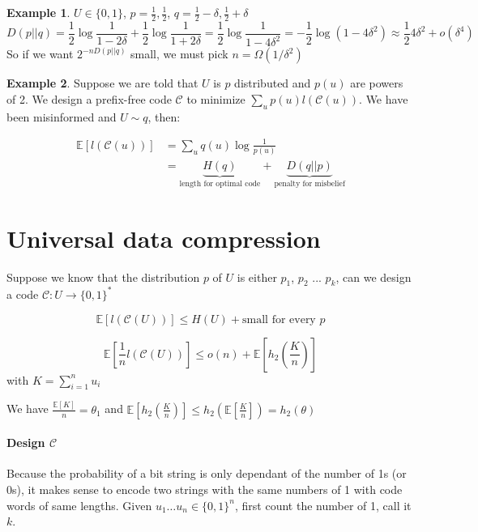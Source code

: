 \documentclass[twoside]{article}
\theoremstyle{definition} %
\newtheorem{example}{Example}
\newcommand{\Ex}[1]{\mathbb{E}\left[#1\right]}
\newcommand{\pfrac}[2]{\left( \frac{#1}{#2} \right)}
\def\C{\mathcal{C}}
\begin{document}
\begin{example}
  $U \in \{0,1\}$, $p=\frac 1 2, \frac 1 2$, $q=\frac 1 2 - \delta, \frac 1 2 + \delta$
  \[
    D(p||q) = \frac 1 2 \log \frac 1 {1-2\delta} + \frac 1 2 \log \frac 1 {1+2\delta} = \frac 1 2 \log \frac 1 {1-4\delta^2} = - \frac 1 2 \log (1-4\delta^2) \approx \frac 1 2 4\delta^2 + o(\delta^4)
  \]
  So if we want $2^{-n D(p||q)}$ small, we must pick $n=\Omega(1/\delta^2)$
\end{example}

\begin{example}
  Suppose we are told that $U$ is $p$ distributed and $p(u)$ are powers of 2. We design a prefix-free code $\C$ to minimize $\sum_u p(u) l(\C(u))$. We have been misinformed and $U\sim q$, then:

  \begin{align*}
    \Ex{l(\C(u))}
    &= \sum_u q(u) \log \frac 1 {p(u)}\\
    &= \underbrace{H(q)}_{\text{length for optimal code}} + \underbrace{D(q||p)}_{\text{penalty for misbelief}}
  \end{align*}
\end{example}


\cleardoublepage
\section{Universal data compression}

Suppose we know that the distribution $p$ of $U$ is either $p_1$, $p_2$ ... $p_k$, can we design a code $\C: U \to \{0,1\}^*$

\[
  \Ex{l(\C(U))} \leq H(U) + \text{small for every } p
\]

\[
  \Ex{\frac 1 n l(\C(U))} \leq o(n) + \Ex{h_2 \pfrac K n}
\]
with $K = \sum_{i=1}^n u_i$

We have $\frac {\Ex{K}} n = \theta_1$ and $\Ex{h_2\pfrac K n} \leq h_2 \left(\Ex{\frac K n} \right) = h_2(\theta)$

\paragraph{Design $\C$}
Because the probability of a bit string is only dependant of the number of
1s (or 0s), it makes sense to encode two strings with the same numbers of 1
with code words of same lengths.
Given $u_1 \dots u_n \in \{0,1\}^n$, first count the number of 1, call it $k$.
\end{document}
